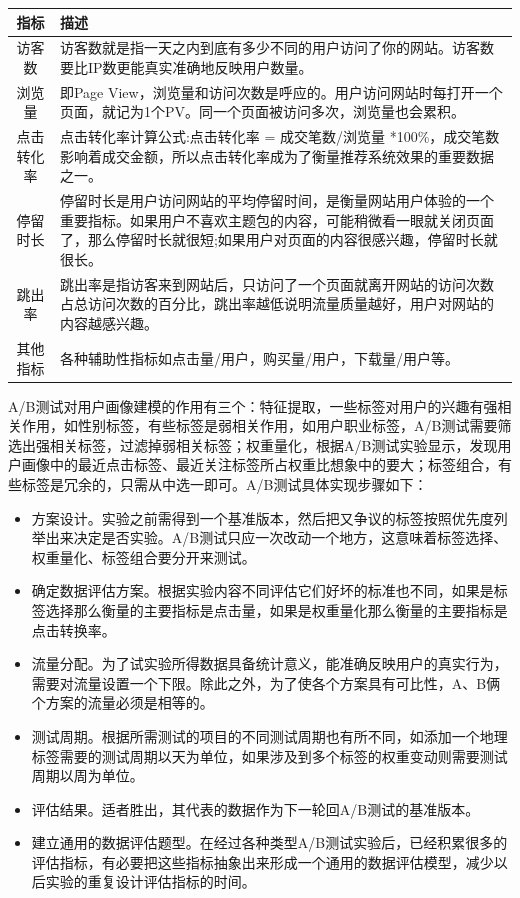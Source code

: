  \begin{table}[htp]
  \centering
  \label{tab:abtest}
  \begin{tabular}{ |c|p{10cm}| } \hline
   指标 & 描述 \\ \hline
   访客数 & 访客数就是指一天之内到底有多少不同的用户访问了你的网站。访客数要比IP数更能真实准确地反映用户数量。\\ \hline
   浏览量 & 即Page View，浏览量和访问次数是呼应的。用户访问网站时每打开一个页面，就记为1个PV。同一个页面被访问多次，浏览量也会累积。 \\ \hline
   点击转化率 & 点击转化率计算公式:点击转化率 = 成交笔数/浏览量 *100\%，成交笔数影响着成交金额，所以点击转化率成为了衡量推荐系统效果的重要数据之一。\\ \hline
   停留时长 & 停留时长是用户访问网站的平均停留时间，是衡量网站用户体验的一个重要指标。如果用户不喜欢主题包的内容，可能稍微看一眼就关闭页面了，那么停留时长就很短;如果用户对页面的内容很感兴趣，停留时长就很长。\\ \hline
   跳出率 & 跳出率是指访客来到网站后，只访问了一个页面就离开网站的访问次数占总访问次数的百分比，跳出率越低说明流量质量越好，用户对网站的内容越感兴趣。 \\ \hline
   其他指标 & 各种辅助性指标如点击量/用户，购买量/用户，下载量/用户等。\\ \hline
  \end{tabular}
  \end{table}

  A/B测试对用户画像建模的作用有三个：特征提取，一些标签对用户的兴趣有强相关作用，如性别标签，有些标签是弱相关作用，如用户职业标签，A/B测试需要筛选出强相关标签，过滤掉弱相关标签；权重量化，根据A/B测试实验显示，发现用户画像中的最近点击标签、最近关注标签所占权重比想象中的要大；标签组合，有些标签是冗余的，只需从中选一即可。A/B测试具体实现步骤如下：

  \begin{itemize}
  \item 方案设计。实验之前需得到一个基准版本，然后把又争议的标签按照优先度列举出来决定是否实验。A/B测试只应一次改动一个地方，这意味着标签选择、权重量化、标签组合要分开来测试。
  \item 确定数据评估方案。根据实验内容不同评估它们好坏的标准也不同，如果是标签选择那么衡量的主要指标是点击量，如果是权重量化那么衡量的主要指标是点击转换率。
  \item 流量分配。为了试实验所得数据具备统计意义，能准确反映用户的真实行为，需要对流量设置一个下限。除此之外，为了使各个方案具有可比性，A、B俩个方案的流量必须是相等的。
  \item 测试周期。根据所需测试的项目的不同测试周期也有所不同，如添加一个地理标签需要的测试周期以天为单位，如果涉及到多个标签的权重变动则需要测试周期以周为单位。
  \item 评估结果。适者胜出，其代表的数据作为下一轮回A/B测试的基准版本。
  \item 建立通用的数据评估题型。在经过各种类型A/B测试实验后，已经积累很多的评估指标，有必要把这些指标抽象出来形成一个通用的数据评估模型，减少以后实验的重复设计评估指标的时间。
  \end{itemize}

